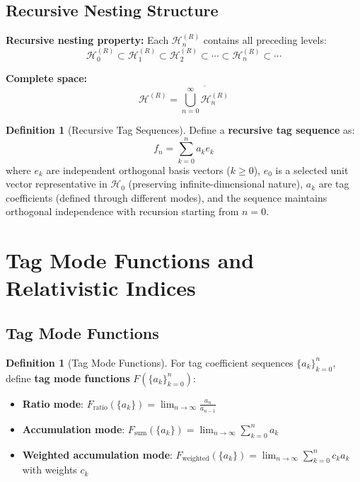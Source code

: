 \documentclass[12pt]{article}
\theoremstyle{plain}
\theoremstyle{definition}
\newtheorem{definition}[theorem]{Definition}
\begin{document}
\subsection{Recursive Nesting Structure}

\textbf{Recursive nesting property:} Each $\mathcal{H}_n^{(R)}$ contains all preceding levels:
$$\mathcal{H}_0^{(R)} \subset \mathcal{H}_1^{(R)} \subset \mathcal{H}_2^{(R)} \subset \cdots \subset \mathcal{H}_n^{(R)} \subset \cdots$$

\textbf{Complete space:}
$$\mathcal{H}^{(R)} = \overline{\bigcup_{n=0}^\infty \mathcal{H}_n^{(R)}}$$

\begin{definition}[Recursive Tag Sequences]
Define a \textbf{recursive tag sequence} as:
$$f_n = \sum_{k=0}^n a_k e_k$$
where $e_k$ are independent orthogonal basis vectors ($k \geq 0$), $e_0$ is a selected unit vector representative in $\mathcal{H}_0$ (preserving infinite-dimensional nature), $a_k$ are tag coefficients (defined through different modes), and the sequence maintains orthogonal independence with recursion starting from $n=0$.
\end{definition}

\section{Tag Mode Functions and Relativistic Indices}

\subsection{Tag Mode Functions}

\begin{definition}[Tag Mode Functions]
For tag coefficient sequences $\{a_k\}_{k=0}^n$, define \textbf{tag mode functions} $F(\{a_k\}_{k=0}^n)$:

\begin{itemize}
\item \textbf{Ratio mode}: $F_{\text{ratio}}(\{a_k\}) = \lim_{n \to \infty} \frac{a_n}{a_{n-1}}$
\item \textbf{Accumulation mode}: $F_{\text{sum}}(\{a_k\}) = \lim_{n \to \infty} \sum_{k=0}^n a_k$
\item \textbf{Weighted accumulation mode}: $F_{\text{weighted}}(\{a_k\}) = \lim_{n \to \infty} \sum_{k=0}^n c_k a_k$ with weights $c_k$
\end{itemize}
\end{definition}
\end{document}
